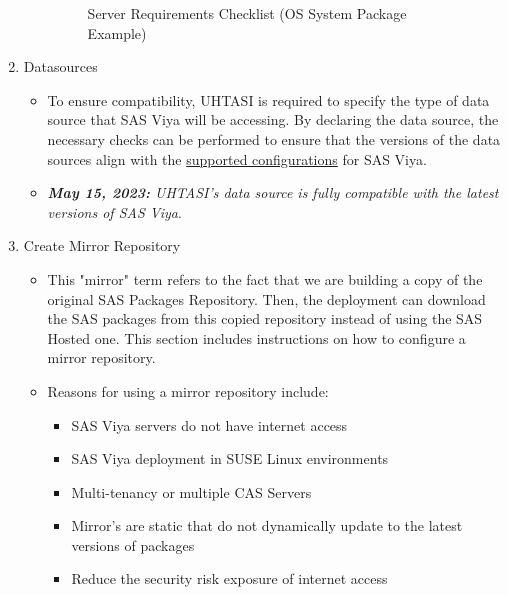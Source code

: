 \begin{enumerate}
\begin{itemize}
\begin{figure}[H]
\begin{center}
\begin{tabular}
            \end{tabular}
        \end{center}
        \caption{Server Requirements Checklist (OS System Package Example)}
        \label{SRC-example}
        \end{figure}
    \end{itemize}
    \item Datasources
    \begin{itemize}
        \item To ensure compatibility, UHTASI is required to specify the type of data source that SAS Viya will be accessing. By declaring the data source, the necessary checks can be performed to ensure that the versions of the data sources align with the \href{https://support.sas.com/en/documentation/third-party-software-reference/viya/35/support-for-databases.html}{supported configurations} for SAS Viya.
    \item \emph{\textbf{May 15, 2023:} UHTASI's data source is fully compatible with the latest versions of SAS Viya}.
    \end{itemize}
    \item Create Mirror Repository
    \begin{itemize}
        \item This "mirror" term refers to the fact that we are building a copy of the original SAS Packages Repository. Then, the deployment can download the SAS packages from this copied repository instead of using the SAS Hosted one. This section includes instructions on how to configure a mirror repository.
        \item Reasons for using a mirror repository include: 
        \begin{itemize}
            \item SAS Viya servers do not have internet access
            \item SAS Viya deployment in SUSE Linux environments
            \item Multi-tenancy or multiple CAS Servers
            \item Mirror's are static that do not dynamically update to the latest versions of packages 
            \item Reduce the security risk exposure of internet access
        \end{itemize}
    \end{itemize}
\end{enumerate}

